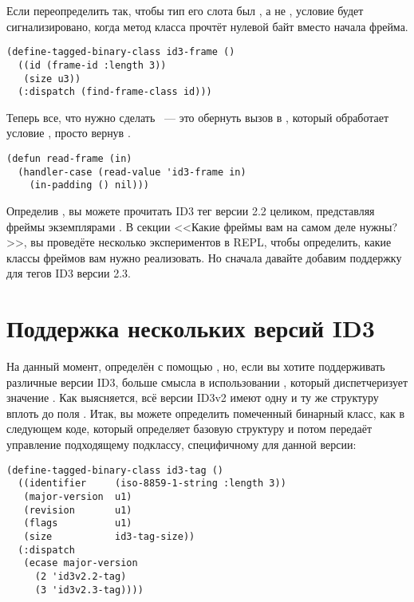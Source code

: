 Если переопределить  так, чтобы тип его слота  был
, а не , условие будет сигнализировано, когда метод
 класса  прочтёт нулевой байт вместо начала фрейма.

\begin{lstlisting}
(define-tagged-binary-class id3-frame ()
  ((id (frame-id :length 3))
   (size u3))
  (:dispatch (find-frame-class id)))
\end{lstlisting}

Теперь все, что нужно сделать ~--- это обернуть вызов  в
, который обработает условие , просто вернув
.

\begin{lstlisting}
(defun read-frame (in)
  (handler-case (read-value 'id3-frame in)
    (in-padding () nil)))
\end{lstlisting}

Определив , вы можете прочитать ID3 тег версии 2.2 целиком, представляя
фреймы экземплярами . В секции <<Какие фреймы вам на самом деле
нужны?>>, вы проведёте несколько экспериментов в REPL, чтобы определить, какие классы
фреймов вам нужно реализовать. Но сначала давайте добавим поддержку для тегов ID3 версии
2.3.

\section{Поддержка нескольких версий ID3}

На данный момент,  определён с помощью , но, если
вы хотите поддерживать различные версии ID3, больше смысла в использовании
, который диспетчеризует значение
. Как выясняется, всё версии ID3v2 имеют одну и ту же структуру вплоть
до поля . Итак, вы можете определить помеченный бинарный класс, как в следующем
коде, который определяет базовую структуру и потом передаёт управление подходящему
подклассу, специфичному для данной версии:

\begin{lstlisting}
(define-tagged-binary-class id3-tag ()
  ((identifier     (iso-8859-1-string :length 3))
   (major-version  u1)
   (revision       u1)
   (flags          u1)
   (size           id3-tag-size))
  (:dispatch 
   (ecase major-version
     (2 'id3v2.2-tag)
     (3 'id3v2.3-tag))))
\end{lstlisting}


